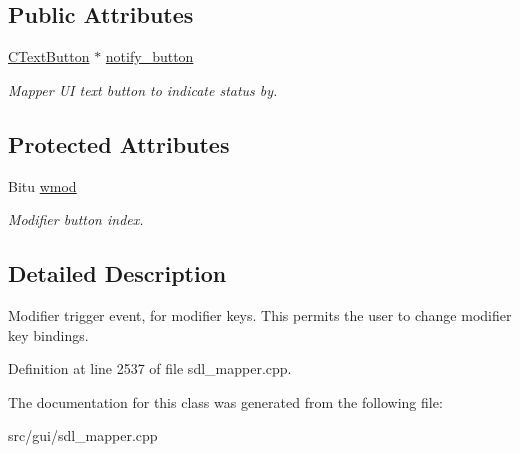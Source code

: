 \subsection*{Public Attributes}
\begin{DoxyCompactItemize}
\item 
\hypertarget{classCModEvent_aa5dc746da9ec638e1959bfd1dddafc75}{\hyperlink{classCTextButton}{C\-Text\-Button} $\ast$ \hyperlink{classCModEvent_aa5dc746da9ec638e1959bfd1dddafc75}{notify\-\_\-button}}\label{classCModEvent_aa5dc746da9ec638e1959bfd1dddafc75}

\begin{DoxyCompactList}\small\item\em Mapper U\-I text button to indicate status by. \end{DoxyCompactList}\end{DoxyCompactItemize}
\subsection*{Protected Attributes}
\begin{DoxyCompactItemize}
\item 
\hypertarget{classCModEvent_a54a25228b8da694c33c44e4b161defd9}{Bitu \hyperlink{classCModEvent_a54a25228b8da694c33c44e4b161defd9}{wmod}}\label{classCModEvent_a54a25228b8da694c33c44e4b161defd9}

\begin{DoxyCompactList}\small\item\em Modifier button index. \end{DoxyCompactList}\end{DoxyCompactItemize}


\subsection{Detailed Description}
Modifier trigger event, for modifier keys. This permits the user to change modifier key bindings. 

Definition at line 2537 of file sdl\-\_\-mapper.\-cpp.



The documentation for this class was generated from the following file\-:\begin{DoxyCompactItemize}
\item 
src/gui/sdl\-\_\-mapper.\-cpp\end{DoxyCompactItemize}
